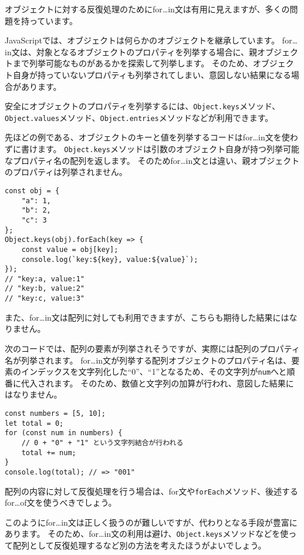 オブジェクトに対する反復処理のためにfor\ldots{}in文は有用に見えますが、多くの問題を持っています。

JavaScriptでは、オブジェクトは何らかのオブジェクトを継承しています。
for\ldots{}in文は、対象となるオブジェクトのプロパティを列挙する場合に、親オブジェクトまで列挙可能なものがあるかを探索して列挙します。
そのため、オブジェクト自身が持っていないプロパティも列挙されてしまい、意図しない結果になる場合があります。

安全にオブジェクトのプロパティを列挙するには、\texttt{Object.keys}メソッド、\texttt{Object.values}メソッド、\texttt{Object.entries}メソッドなどが利用できます。

先ほどの例である、オブジェクトのキーと値を列挙するコードはfor\ldots{}in文を使わずに書けます。
\texttt{Object.keys}メソッドは引数のオブジェクト自身が持つ列挙可能なプロパティ名の配列を返します。
そのためfor\ldots{}in文とは違い、親オブジェクトのプロパティは列挙されません。

\begin{lstlisting}
const obj = {
    "a": 1,
    "b": 2,
    "c": 3
};
Object.keys(obj).forEach(key => {
    const value = obj[key];
    console.log(`key:${key}, value:${value}`);
});
// "key:a, value:1"
// "key:b, value:2"
// "key:c, value:3"
\end{lstlisting}

また、for\ldots{}in文は配列に対しても利用できますが、こちらも期待した結果にはなりません。

次のコードでは、配列の要素が列挙されそうですが、実際には配列のプロパティ名が列挙されます。
for\ldots{}in文が列挙する配列オブジェクトのプロパティ名は、要素のインデックスを文字列化した``0''、``1''となるため、その文字列が\texttt{num}へと順番に代入されます。
そのため、数値と文字列の加算が行われ、意図した結果にはなりません。

\begin{lstlisting}
const numbers = [5, 10];
let total = 0;
for (const num in numbers) {
    // 0 + "0" + "1" という文字列結合が行われる
    total += num;
}
console.log(total); // => "001"
\end{lstlisting}

配列の内容に対して反復処理を行う場合は、for文や\texttt{forEach}メソッド、後述するfor\ldots{}of文を使うべきでしょう。

このようにfor\ldots{}in文は正しく扱うのが難しいですが、代わりとなる手段が豊富にあります。
そのため、for\ldots{}in文の利用は避け、\texttt{Object.keys}メソッドなどを使って配列として反復処理するなど別の方法を考えたほうがよいでしょう。

